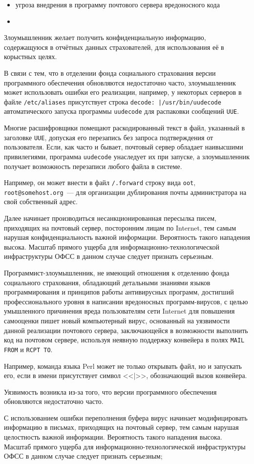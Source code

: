 \begin{itemize}
\item угроза внедрения в программу почтового сервера вредоносного кода
\item 
\end{itemize}

Злоумышленник желает получить конфиденциальную информацию,
содержащуюся в отчётных данных страхователей, для использования её в
корыстных целях.

В связи с тем, что в отделении фонда социального страхования версии
программного обеспечения обновляются недостаточно часто, злоумышленник
может использовать ошибки его реализации, например, у некоторых
серверов в файле \texttt{/etc/aliases} присутствует строка
\texttt{decode: |/usr/bin/uudecode} автоматического запуска программы
\texttt{uudecode} для распаковки сообщений \texttt{UUE}.

Многие расшифровщики помещают раскодированный текст в файл, указанный
в заголовке \texttt{UUE}, допуская его перезапись без запроса
подтверждения от пользователя. Если, как часто и бывает, почтовый
сервер обладает наивысшими привилегиями, программа \texttt{uudecode}
унаследует их при запуске, а злоумышленник получает возможность
перезаписи любого файла в системе.

Например, он может внести в файл \texttt{/.forward} строку вида
\texttt{oot}, \texttt{root@somehost.org}~--- для организации
дублирования почты администратора на свой собственный адрес.

Далее начинает производиться несанкционированная пересылка писем,
приходящих на почтовый сервер, посторонним лицам по Internet, тем
самым нарушая конфиденциальность важной информации. Вероятность такого
нападения высока. Масштаб прямого ущерба для
информационно-технологической инфраструктуры ОФСС в данном случае
следует признать серьезным.

Программист-злоумышленник, не имеющий отношения к отделению фонда
социального страхования, обладающий детальными знаниями языков
программирования и принципов работы антивирусных программ, достигший
профессионального уровня в написании вредоносных программ-вирусов, с
целью умышленного причинения вреда пользователям сети Internet для
повышения самооценки пишет новый компьютерный вирус, основанный на
уязвимости данной реализации почтового сервера, заключающейся в
возможности выполнить код на почтовом сервере, используя неявную
поддержку конвейера в полях \texttt{MAIL FROM} и \texttt{RCPT TO}.

Например, команда языка Perl может не только открывать файл, но
и запускать его, если в имени присутствует символ <<|>>, обозначающий
вызов конвейера.

Уязвимость возникла из-за того, что версии программного обеспечения
обновляются недостаточно часто.

С использованием ошибки переполнения буфера вирус начинает
модифицировать информацию в письмах, приходящих на почтовый сервер,
тем самым нарушая целостность важной информации. Вероятность такого
нападения высока. Масштаб прямого ущерба для
информационно-технологической инфраструктуры ОФСС в данном случае
следует признать серьезным;

